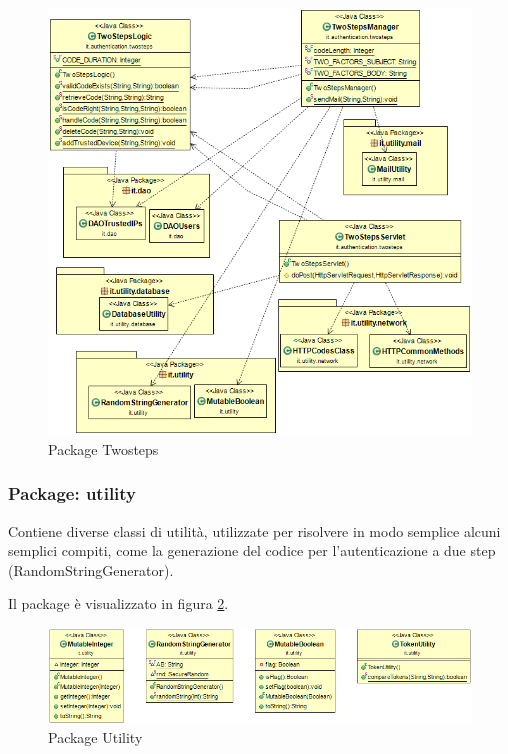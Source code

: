 \begin{figure}[!htbp]
	\centering
	\includegraphics[scale = .5]{img/dependencies_twosteps.png}
	\caption{Package Twosteps}
	\label{gfx:dependencies_twosteps}
\end{figure}

\subsubsection{Package: \textbf{utility}}

Contiene diverse classi di utilità, utilizzate per risolvere in modo semplice alcuni semplici compiti, come la generazione del codice per l’autenticazione a due step (RandomStringGenerator).


Il package è visualizzato in figura \ref{gfx:dependencies_utility}.

\begin{figure}[!htbp]
	\centering
	\includegraphics[scale = .5]{img/dependencies_utility}
	\caption{Package Utility}
	\label{gfx:dependencies_utility}
\end{figure}

